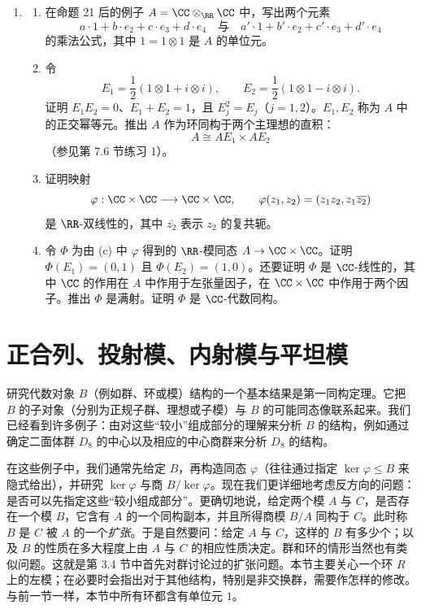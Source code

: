 \begin{enumerate}[label=\arabic*.]
	下一题说明本节末引入的环 $\CC\otimes_{\RR}\CC$ 同构于 $\CC\times\CC$。也可通过练习 26 与第 9.5 节命题 16 证明这一点，因为 $\CC\cong\RR[x]/(x^2+1)$。环 $\CC\times\CC$ 也在第 1 节练习 23 中讨论过。
	\item
	\begin{enumerate}[label=(\alph*)]
		\item 在命题 21 后的例子 $A=\CC\otimes_{\RR}\CC$ 中，写出两个元素
		\[
		a\cdot1+b\cdot e_2+c\cdot e_3+d\cdot e_4
		\quad\text{与}\quad
		a'\cdot1+b'\cdot e_2+c'\cdot e_3+d'\cdot e_4
		\]
		的乘法公式，其中 $1=1\otimes1$ 是 $A$ 的单位元。
		\item 令
		\[
		E_1=\frac12(1\otimes1+i\otimes i),\qquad
		E_2=\frac12(1\otimes1-i\otimes i).
		\]
		证明 $E_1E_2=0$、$E_1+E_2=1$，且 $E_j^2=E_j$（$j=1,2$）。$E_1,E_2$ 称为 $A$ 中的正交幂等元。推出 $A$ 作为环同构于两个主理想的直积：
		\[
		A\cong AE_1\times AE_2
		\]
		（参见第 7.6 节练习 1）。
		\item 证明映射
		\[
		\varphi:\CC\times\CC\longrightarrow\CC\times\CC,
		\qquad \varphi(z_1,z_2)=(z_1z_2,z_1\overline{z_2})
		\]
		是 $\RR$-双线性的，其中 $\overline{z_2}$ 表示 $z_2$ 的复共轭。
		\item 令 $\Phi$ 为由 (c) 中 $\varphi$ 得到的 $\RR$-模同态 $A\to\CC\times\CC$。证明 $\Phi(E_1)=(0,1)$ 且 $\Phi(E_2)=(1,0)$。还要证明 $\Phi$ 是 $\CC$-线性的，其中 $\CC$ 的作用在 $A$ 中作用于左张量因子，在 $\CC\times\CC$ 中作用于两个因子。推出 $\Phi$ 是满射。证明 $\Phi$ 是 $\CC$-代数同构。
	\end{enumerate}
\end{enumerate}


\section{正合列、投射模、内射模与平坦模}

研究代数对象 $B$（例如群、环或模）结构的一个基本结果是第一同构定理。它把 $B$ 的子对象（分别为正规子群、理想或子模）与 $B$ 的可能同态像联系起来。我们已经看到许多例子：由对这些“较小”组成部分的理解来分析 $B$ 的结构，例如通过确定二面体群 $D_8$ 的中心以及相应的中心商群来分析 $D_8$ 的结构。

在这些例子中，我们通常先给定 $B$，再构造同态 $\varphi$（往往通过指定 $\ker\varphi\leq B$ 来隐式给出），并研究 $\ker\varphi$ 与商 $B/\ker\varphi$。现在我们更详细地考虑反方向的问题：是否可以先指定这些“较小组成部分”。更确切地说，给定两个模 $A$ 与 $C$，是否存在一个模 $B$，它含有 $A$ 的一个同构副本，并且所得商模 $B/A$ 同构于 $C$。此时称 $B$ 是 $C$ 被 $A$ 的一个\emph{扩张}。于是自然要问：给定 $A$ 与 $C$，这样的 $B$ 有多少个；以及 $B$ 的性质在多大程度上由 $A$ 与 $C$ 的相应性质决定。群和环的情形当然也有类似问题。这就是第 3.4 节中首先对群讨论过的扩张问题。本节主要关心一个环 $R$ 上的左模；在必要时会指出对于其他结构，特别是非交换群，需要作怎样的修改。与前一节一样，本节中所有环都含有单位元 $1$。

